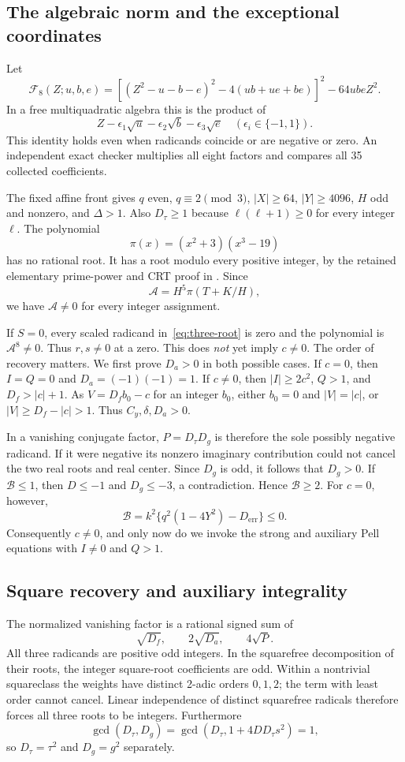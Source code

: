 \subsection{The algebraic norm and the exceptional coordinates}
Let
\[
 \mathcal F_8(Z;u,b,e)=
 [(Z^2-u-b-e)^2-4(ub+ue+be)]^2-64ubeZ^2.
\]
In a free multiquadratic algebra this is the product of
\[
 Z-\epsilon_1\sqrt u-\epsilon_2\sqrt b-\epsilon_3\sqrt e
 \quad(\epsilon_i\in\{-1,1\}).
\]
This identity holds even when radicands coincide or are negative or zero.
An independent exact checker multiplies all eight factors and compares
all 35 collected coefficients.

The fixed affine front gives $q$ even, $q\equiv2\pmod3$, $|X|\ge64$,
$|Y|\ge4096$, $H$ odd and nonzero, and $\Delta>1$.
Also $D_\tau\ge1$ because $\ell(\ell+1)\ge0$ for every integer $\ell$.
The polynomial
\[
 \pi(x)=(x^2+3)(x^3-19)
\]
has no rational root. It has a root modulo every positive integer, by
the retained elementary prime-power and CRT proof in
. Since
\[
 \mathcal A=H^5\pi(T+K/H),
\]
we have $\mathcal A\ne0$ for every integer assignment.

If $S=0$, every scaled radicand in~\eqref{eq:three-root} is zero and
the polynomial is $\mathcal A^8\ne0$. Thus $r,s\ne0$ at a zero.
This does \emph{not} yet imply $c\ne0$. The order of recovery matters.
We first prove $D_a>0$ in both possible cases. If $c=0$, then $I=Q=0$
and $D_a=(-1)(-1)=1$. If $c\ne0$, then $|I|\ge2c^2$,
$Q>1$, and $D_f>|c|+1$. As $V=D_f b_0-c$ for an integer $b_0$,
either $b_0=0$ and $|V|=|c|$, or
$|V|\ge D_f-|c|>1$. Thus $C_y,\delta,D_a>0$.

In a vanishing conjugate factor, $P=D_\tau D_g$ is therefore the sole
possibly negative radicand. If it were negative its nonzero imaginary
contribution could not cancel the two real roots and real center.
Since $D_g$ is odd, it follows that $D_g>0$. If $\mathcal B\le1$, then
$D\le-1$ and $D_g\le-3$, a contradiction. Hence $\mathcal B\ge2$.
For $c=0$, however,
\[
 \mathcal B=k^2\{q^2(1-4Y^2)-D_{\mathrm{err}}\}\le0.
\]
Consequently $c\ne0$, and only now do we invoke the strong and auxiliary
Pell equations with $I\ne0$ and $Q>1$.

\subsection{Square recovery and auxiliary integrality}
The normalized vanishing factor is a rational signed sum of
\[
 \sqrt{D_f},\qquad 2\sqrt{D_a},\qquad4\sqrt P.
\]
All three radicands are positive odd integers. In the squarefree
decomposition of their roots, the integer square-root coefficients are
odd. Within a nontrivial squareclass the weights have distinct 2-adic
orders $0,1,2$; the term with least order cannot cancel. Linear independence
of distinct squarefree radicals therefore forces all three roots to be
integers. Furthermore
\[
 \gcd(D_\tau,D_g)=\gcd(D_\tau,1+4D D_\tau s^2)=1,
\]
so $D_\tau=\tau^2$ and $D_g=g^2$ separately.

